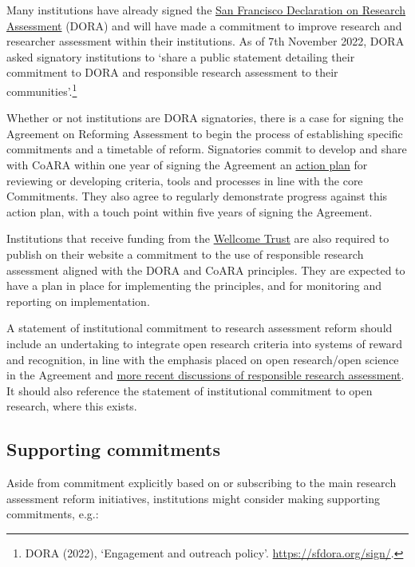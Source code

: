 \documentclass[
  letterpaper,
  DIV=11,
  numbers=noendperiod,
  oneside]{scrreprt}
\begin{document}
Many institutions have already signed the
\href{https://sfdora.org/read/}{San Francisco Declaration on Research
Assessment} (DORA) and will have made a commitment to improve research
and researcher assessment within their institutions. As of 7th November
2022, DORA asked signatory institutions to `share a public statement
detailing their commitment to DORA and responsible research assessment
to their communities'.\footnote{DORA (2022), `Engagement and outreach
  policy'. \url{https://sfdora.org/sign/}.}

Whether or not institutions are DORA signatories, there is a case for
signing the Agreement on Reforming Assessment to begin the process of
establishing specific commitments and a timetable of reform. Signatories
commit to develop and share with CoARA within one year of signing the
Agreement an \href{https://coara.eu/agreement/action-plan/}{action plan}
for reviewing or developing criteria, tools and processes in line with
the core Commitments. They also agree to regularly demonstrate progress
against this action plan, with a touch point within five years of
signing the Agreement.

Institutions that receive funding from the
\href{https://wellcome.org/grant-funding/guidance/open-access-guidance/research-organisations-how-implement-responsible-and-fair-approaches-research}{Wellcome
Trust} are also required to publish on their website a commitment to the
use of responsible research assessment aligned with the DORA and CoARA
principles. They are expected to have a plan in place for implementing
the principles, and for monitoring and reporting on implementation.

A statement of institutional commitment to research assessment reform
should include an undertaking to integrate open research criteria into
systems of reward and recognition, in line with the emphasis placed on
open research/open science in the Agreement and
\href{guide-intro.qmd}{more recent discussions of responsible research
assessment}. It should also reference the statement of institutional
commitment to open research, where this exists.

\subsection{Supporting commitments}\label{supporting-commitments}

Aside from commitment explicitly based on or subscribing to the main
research assessment reform initiatives, institutions might consider
making supporting commitments, e.g.:
\end{document}
